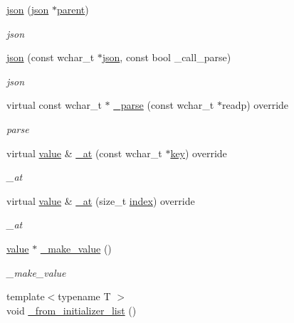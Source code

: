 \begin{DoxyCompactItemize}
\item 
\hyperlink{classformat_1_1json_a68a4f53726787a747982f6776d5c3086}{json} (\hyperlink{classformat_1_1json}{json} $\ast$\hyperlink{classformat_1_1value_a86c03ec8810bfd0d60ec49095120040d}{parent})
\begin{DoxyCompactList}\small\item\em json \end{DoxyCompactList}\item 
\hyperlink{classformat_1_1json_a76747146e785595b4c24d021feb8c5c0}{json} (const wchar\+\_\+t $\ast$\hyperlink{classformat_1_1json}{json}, const bool \+\_\+call\+\_\+parse)
\begin{DoxyCompactList}\small\item\em json \end{DoxyCompactList}\item 
virtual const wchar\+\_\+t $\ast$ \hyperlink{classformat_1_1json_ab316c1d4c585610a60d634605a4b871e}{\+\_\+parse} (const wchar\+\_\+t $\ast$readp) override
\begin{DoxyCompactList}\small\item\em parse \end{DoxyCompactList}\item 
virtual \hyperlink{classformat_1_1value_aa6b85823936bf7b8ab78d3f8d443c00d}{value} \& \hyperlink{classformat_1_1json_afcb78dfb597d7d609c66a4d5b6575082}{\+\_\+at} (const wchar\+\_\+t $\ast$\hyperlink{classformat_1_1value_ad4865e7984fc9f3b5ce7c17fd7ac740c}{key}) override
\begin{DoxyCompactList}\small\item\em \+\_\+at \end{DoxyCompactList}\item 
virtual \hyperlink{classformat_1_1value_aa6b85823936bf7b8ab78d3f8d443c00d}{value} \& \hyperlink{classformat_1_1json_a4a3924d5a112cda2bcee45ddf92a3d52}{\+\_\+at} (size\+\_\+t \hyperlink{classformat_1_1value_aaa429b28cc0edf5a3589b89a1820ad62}{index}) override
\begin{DoxyCompactList}\small\item\em \+\_\+at \end{DoxyCompactList}\item 
\hyperlink{classformat_1_1value_aa6b85823936bf7b8ab78d3f8d443c00d}{value} $\ast$ \hyperlink{classformat_1_1json_ae44c43633cd5cf6fbae535cb622ec778}{\+\_\+make\+\_\+value} ()
\begin{DoxyCompactList}\small\item\em \+\_\+make\+\_\+value \end{DoxyCompactList}\item 
{\footnotesize template$<$typename T $>$ }\\void \hyperlink{classformat_1_1json_ad26c343d5b9bcaf6f19b6049bfe2a7e7}{\+\_\+from\+\_\+initializer\+\_\+list} ()\hypertarget{classformat_1_1json_ad26c343d5b9bcaf6f19b6049bfe2a7e7}{}\label{classformat_1_1json_ad26c343d5b9bcaf6f19b6049bfe2a7e7}


\end{DoxyCompactItemize}
